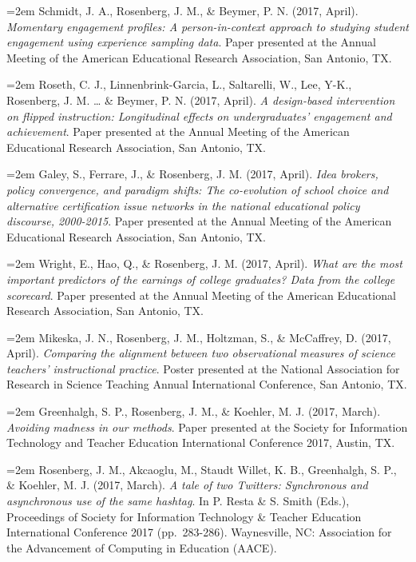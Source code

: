 \documentclass[14,]{article}
\begin{document}
\hangindent=2em Schmidt, J. A., Rosenberg, J. M., \& Beymer, P. N.
(2017, April). \emph{Momentary engagement profiles: A person-in-context
approach to studying student engagement using experience sampling data}.
Paper presented at the Annual Meeting of the American Educational
Research Association, San Antonio, TX.

\hangindent=2em Roseth, C. J., Linnenbrink-Garcia, L., Saltarelli, W.,
Lee, Y-K., Rosenberg, J. M. \ldots{} \& Beymer, P. N. (2017, April).
\emph{A design-based intervention on flipped instruction: Longitudinal
effects on undergraduates' engagement and achievement}. Paper presented
at the Annual Meeting of the American Educational Research Association,
San Antonio, TX.

\hangindent=2em Galey, S., Ferrare, J., \& Rosenberg, J. M. (2017,
April). \emph{Idea brokers, policy convergence, and paradigm shifts: The
co-evolution of school choice and alternative certification issue
networks in the national educational policy discourse, 2000-2015}. Paper
presented at the Annual Meeting of the American Educational Research
Association, San Antonio, TX.

\hangindent=2em Wright, E., Hao, Q., \& Rosenberg, J. M. (2017, April).
\emph{What are the most important predictors of the earnings of college
graduates? Data from the college scorecard}. Paper presented at the
Annual Meeting of the American Educational Research Association, San
Antonio, TX.

\hangindent=2em Mikeska, J. N., Rosenberg, J. M., Holtzman, S., \&
McCaffrey, D. (2017, April). \emph{Comparing the alignment between two
observational measures of science teachers' instructional practice}.
Poster presented at the National Association for Research in Science
Teaching Annual International Conference, San Antonio, TX.

\hangindent=2em Greenhalgh, S. P., Rosenberg, J. M., \& Koehler, M. J.
(2017, March). \emph{Avoiding madness in our methods}. Paper presented
at the Society for Information Technology and Teacher Education
International Conference 2017, Austin, TX.

\hangindent=2em Rosenberg, J. M., Akcaoglu, M., Staudt Willet, K. B.,
Greenhalgh, S. P., \& Koehler, M. J. (2017, March). \emph{A tale of two
Twitters: Synchronous and asynchronous use of the same hashtag}. In P.
Resta \& S. Smith (Eds.), Proceedings of Society for Information
Technology \& Teacher Education International Conference 2017
(pp.~283-286). Waynesville, NC: Association for the Advancement of
Computing in Education (AACE).
\end{document}
